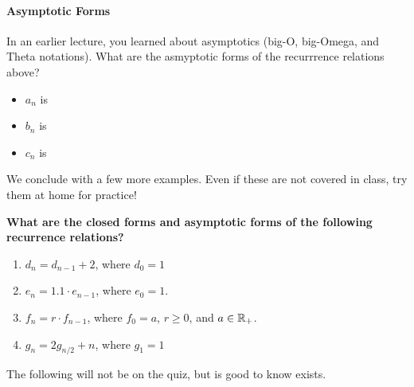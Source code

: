 \paragraph{Asymptotic Forms}
In an earlier lecture, you learned about asymptotics (big-O, big-Omega, and
Theta notations).  What are the asmyptotic forms of the recurrrence relations
above?

\begin{itemize}
    \item $a_n$ is
    \item $b_n$ is
    \item $c_n$ is
\end{itemize}

We conclude with a few more examples.  Even if these are not covered in class,
try them at home for practice!


{\bf What are the closed forms and asymptotic forms of the following recurrence
relations?}
\begin{enumerate}
    \item $d_n=d_{n-1}+2$, where $d_0=1$  %
    \item $e_n = 1.1\cdot e_{n-1}$, where $e_0=1$. %
    \item $f_n = r\cdot f_{n-1}$, where $f_0=a$, $r \geq 0$, and $a \in {\mathbb R}_+$. %
    \item $g_n = 2 g_{n/2} + n$, where $g_1=1$ %
\end{enumerate}

\pagebreak

The following will not be on the quiz, but is good to know exists.

